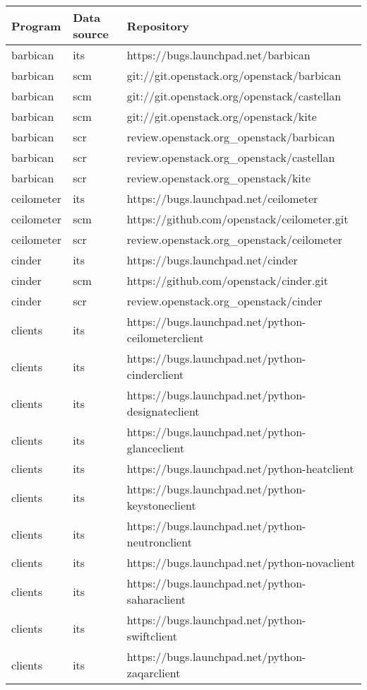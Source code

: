\begin{center}
\begin{longtable}{|p{4cm}|p{1cm}|p{10cm}|}
\hline
Program & Data source & Repository \\
\hline

barbican&its&https://bugs.launchpad.net/barbican\\ 
barbican&scm&git://git.openstack.org/openstack/barbican\\ 
barbican&scm&git://git.openstack.org/openstack/castellan\\ 
barbican&scm&git://git.openstack.org/openstack/kite\\ 
barbican&scr&review.openstack.org\_openstack/barbican\\ 
barbican&scr&review.openstack.org\_openstack/castellan\\ 
barbican&scr&review.openstack.org\_openstack/kite\\ 
ceilometer&its&https://bugs.launchpad.net/ceilometer\\ 
ceilometer&scm&https://github.com/openstack/ceilometer.git\\ 
ceilometer&scr&review.openstack.org\_openstack/ceilometer\\ 
cinder&its&https://bugs.launchpad.net/cinder\\ 
cinder&scm&https://github.com/openstack/cinder.git\\ 
cinder&scr&review.openstack.org\_openstack/cinder\\ 
clients&its&https://bugs.launchpad.net/python-ceilometerclient\\ 
clients&its&https://bugs.launchpad.net/python-cinderclient\\ 
clients&its&https://bugs.launchpad.net/python-designateclient\\ 
clients&its&https://bugs.launchpad.net/python-glanceclient\\ 
clients&its&https://bugs.launchpad.net/python-heatclient\\ 
clients&its&https://bugs.launchpad.net/python-keystoneclient\\ 
clients&its&https://bugs.launchpad.net/python-neutronclient\\ 
clients&its&https://bugs.launchpad.net/python-novaclient\\ 
clients&its&https://bugs.launchpad.net/python-saharaclient\\ 
clients&its&https://bugs.launchpad.net/python-swiftclient\\ 
clients&its&https://bugs.launchpad.net/python-zaqarclient\\ 

\end{longtable}
\end{center}
